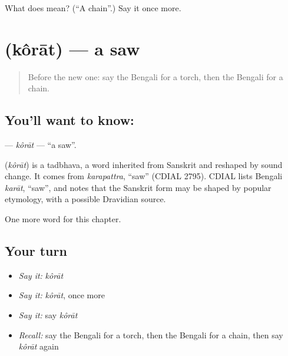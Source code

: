 \begin{tcolorbox}[breakable,colback=teal!4,colframe=teal!35!black,title={Before you move on}]
What does  mean? (\textquotedblleft{}A chain\textquotedblright{}.) Say it once more.
\end{tcolorbox}
\section[\texorpdfstring{\bn{করাত} (kôrāt)}{করাত (kôrāt)}]{ (kôrāt) — a saw}

\label{lesson:BN-C229-korat}



\begin{quote}
Before the new one: say the Bengali for a torch, then the Bengali for a chain.
\end{quote}

\subsection*{You'll want to know: }
\textbf{} — \emph{kôrāt} — \textquotedblleft{}a saw\textquotedblright{}.

\begin{cousinweb}
\textbf{} (\emph{kôrāt}) is a tadbhava, a word inherited from Sanskrit and reshaped by sound change. It comes from \emph{karapattra}, \textquotedblleft{}saw\textquotedblright{} (CDIAL 2795). CDIAL lists Bengali \emph{karāt}, \textquotedblleft{}saw\textquotedblright{}, and notes that the Sanskrit form may be shaped by popular etymology, with a possible Dravidian source.
\end{cousinweb}

\begin{grammarlens}[title={What you've built}]
One more word for this chapter.
\end{grammarlens}

\subsection*{Your turn}
\begin{itemize}
\raggedright
  \item \emph{Say it:} \emph{kôrāt}
  \item \emph{Say it:} \emph{kôrāt}, once more
  \item \emph{Say it:} say \emph{kôrāt}
  \item \emph{Recall:} say the Bengali for a torch, then the Bengali for a chain, then say \emph{kôrāt} again
\end{itemize}

